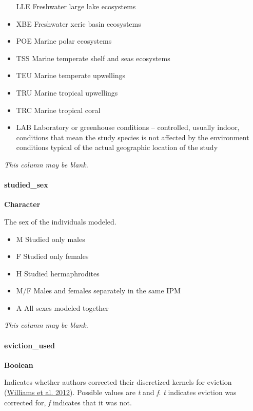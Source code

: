 \documentclass[]{article}
\let\oldparagraph\paragraph
\renewcommand{\paragraph}[1]{\oldparagraph{#1}\mbox{}}
\begin{document}
\begin{itemize}
  LLE Freshwater large lake ecosystems
\item
  XBE Freshwater xeric basin ecosystems
\item
  POE Marine polar ecosystems
\item
  TSS Marine temperate shelf and seas ecosystems
\item
  TEU Marine temperate upwellings
\item
  TRU Marine tropical upwellings
\item
  TRC Marine tropical coral
\item
  LAB Laboratory or greenhouse conditions -- controlled, usually indoor,
  conditions that mean the study species is not affected by the
  environment conditions typical of the actual geographic location of
  the study
\end{itemize}

\emph{This column may be blank.}

\paragraph{studied\_sex}\label{studied_sex}

\textbf{Character}

The sex of the individuals modeled.

\begin{itemize}
\item
  M Studied only males
\item
  F Studied only females
\item
  H Studied hermaphrodites
\item
  M/F Males and females separately in the same IPM
\item
  A All sexes modeled together
\end{itemize}

\emph{This column may be blank.}

\paragraph{eviction\_used}\label{eviction_used}

\textbf{Boolean}

Indicates whether authors corrected their discretized kernels for
eviction
(\href{https://scholarship.rice.edu/bitstream/handle/1911/69874/Avoiding\%20unintentional\%20eviction.pdf?sequence=1}{Williams
et al. 2012}). Possible values are \emph{t} and \emph{f}. \emph{t}
indicates eviction was corrected for, \emph{f} indicates that it was
not.
\end{document}
